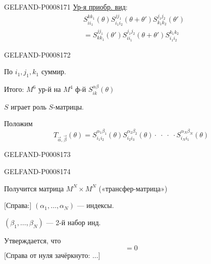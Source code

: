 \begin{GelfandAdjacentEvidence}{GELFAND-P000817}{1}
\uline{Ур-я приобр. вид}:
\begin{equation*}
\begin{aligned}
&S^{kk_1}_{ii_1}(\theta)S^{jj_1}_{i_1i_2}(\theta+\theta')
  S^{j_1j_2}_{k_1k_2}(\theta')\\
&=S^{jj_1}_{kk_1}(\theta')S^{j_1j_2}_{ii_1}(\theta+\theta')
  S^{k_1k_2}_{i_1i_2}
\end{aligned}\tag{2}
\end{equation*}
\end{GelfandAdjacentEvidence}
\begin{GelfandAdjacentEvidence}{GELFAND-P000817}{2}


По \(i_1,j_1,k_1\) суммир.

Итого: \(M^6\) ур-й на \(M^4\) ф-й \(S^{\alpha\beta}_{ik}(\theta)\)

\(S\) играет роль \(S\)-матрицы.

Положим
\begin{equation*}
T_{\vec{\alpha},\vec{\beta}}(\theta)=
S^{\alpha_1\beta_1}_{i_1i_2}(\theta)
S^{\alpha_2\beta_2}_{i_2i_3}(\theta)
\cdot\;\cdot\;\cdot\;\cdot
S^{\alpha_N\beta_N}_{i_Ni_1}(\theta)\tag{3}
\end{equation*}
\end{GelfandAdjacentEvidence}
\begin{GelfandAdjacentEvidence}{GELFAND-P000817}{3}


\end{GelfandAdjacentEvidence}
\begin{GelfandAdjacentEvidence}{GELFAND-P000817}{4}


Получится матрица \(M^N\times M^N\)
(«трансфер-матрица»)

[Справа:] \((\alpha_1,\ldots,\alpha_N)\) — индексы.

\((\beta_1,\ldots,\beta_N)\) — 2-й набор инд.

Утверждается, что
\begin{equation*}
[T(\theta),T(\theta')]=0\tag{4}
\end{equation*}
[Справа от нуля зачёркнуто: \(\ldots\)]
\end{GelfandAdjacentEvidence}
